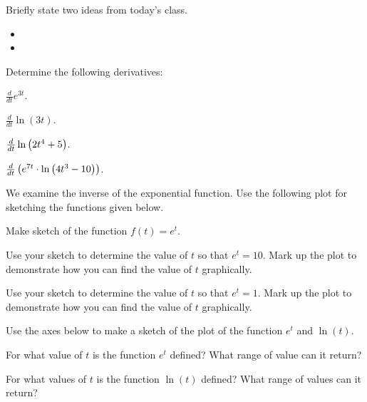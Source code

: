 \begin{problem}
\item Briefly state two ideas from today's class.
  \begin{itemize}
  \item 
  \item 
  \end{itemize}
\item Determine the following derivatives:
  \begin{subproblem}
    \item $\frac{d}{dt} e^{3t}$.
      \vfill
    \item $\frac{d}{dt} \ln(3t)$.
      \vfill
    \item $\frac{d}{dt} \ln\left( 2t^4 + 5\right)$.
      \vfill
    \item $\frac{d}{dt} \left( e^{7t} \cdot \ln \left( 4t^3 - 10\right) \right)$.
      \vfill
  \end{subproblem}

\clearpage

\item We examine the inverse of the exponential function. Use the
  following plot for sketching the functions given below.

  \scalebox{0.75}{}

  \begin{subproblem}
  \item Make sketch of the function $f(t) = e^t$.
  \item Use your sketch to determine the value of $t$ so that
    $e^t=10$. Mark up the plot to demonstrate how you can find the
    value of $t$ graphically.
  \item Use your sketch to determine the value of $t$ so that
    $e^t=1$. Mark up the plot to demonstrate how you can find the
    value of $t$ graphically.
  \end{subproblem}

\item Use the axes below to make a sketch of the plot of the function
  $e^t$ and $\ln(t)$.

  \scalebox{0.75}{}


\item For what value of $t$ is the function $e^t$ defined? What range
  of value can it return?

\item For what values of $t$ is the function $\ln(t)$ defined? What
  range of values can it return?



\end{problem}

